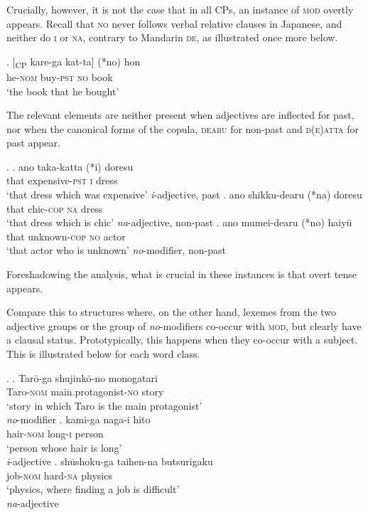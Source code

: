 Crucially, however, it is not the case that in all CPs, an instance of \textsc{mod} overtly appears. Recall that \textsc{no} never follows verbal relative clauses in Japanese, and neither do \textsc{i} or \textsc{na}, contrary to Mandarin \textsc{de}, as illustrated once more below.

\exg. [\textsubscript{CP} kare-ga kat-ta] (*no) hon\\
{} he-\textsc{nom} buy-\textsc{pst} \textsc{no} book\\
`the book that he bought’

\largerpage
The relevant elements are neither present when adjectives are inflected for past, nor when the canonical forms of the copula, \textsc{dearu} for non-past and \textsc{d(e)atta} for past appear. 

%

\ex. \ag. ano taka-katta (*i) doresu\\
that expensive-\textsc{pst} \textsc{i} dress\\
`that dress which was expensive' \null \hfill \textit{i}-adjective, past
\bg. ano shikku-dearu (*na) doresu\\
that chic-\textsc{cop} \textsc{na} dress\\
`that dress which is chic’ \null \hfill \textit{na}-adjective, non-past
\cg. ano mumei-dearu (*no) haiyū\\
that unknown-\textsc{cop} \textsc{no} actor\\
`that actor who is unknown' \null \hfill \textit{no}-modifier, non-past

Foreshadowing the analysis, what is crucial in these instances is that overt tense appears.

Compare this to structures where, on the other hand, lexemes from the two adjective groups or the group of \textit{no}-modifiers co-occur with \textsc{mod}, but clearly have a clausal status. Prototypically, this happens when they co-occur with a subject. This is illustrated below for each word class.

\ex. \ag. Tarō-ga shujinkō-no monogatari\\
Taro-\textsc{nom} main.protagonist-\textsc{no} story\\
`story in which Taro is the main protagonist' \\ \null \hfill \textit{no}-modifier \citep[66]{watanabe:2010:notes}
\bg. kami-ga naga-i hito\\
hair-\textsc{nom} long-\textsc{i} person\\
`person whose hair is long' \\ \null \hfill \textit{i}-adjective \citep[1278]{miyagawa:2011:genitive}
\cg. shūshoku-ga taihen-na butsurigaku\\
job-\textsc{nom} hard-\textsc{na} physics\\
`physics, where finding a job is difficult' \\ \null \hfill \textit{na}-adjective \citep[255]{kuno:1973:structure}

